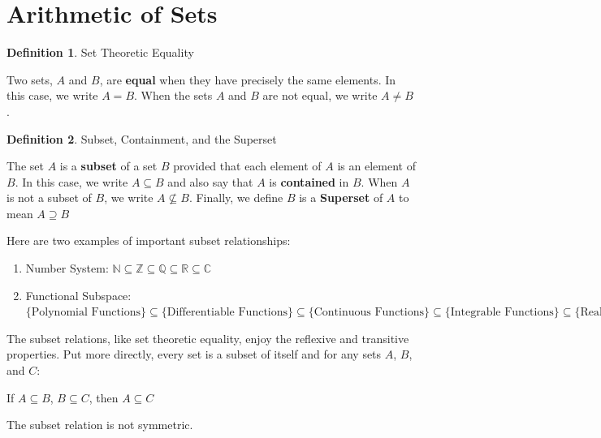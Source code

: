 \documentclass{book}
\theoremstyle{definition}
\newtheorem{definition}{Definition}[section]
\theoremstyle{remark}
\newcommand{\bb}[1]{\mathbb{#1}}
\begin{document}
\newpage
\section{Arithmetic of Sets}

\begin{definition}
Set Theoretic Equality \\
    \begin{tcolorbox}
        Two sets, $A$ and $B$, are {\bf equal} when they have precisely the same elements. In this case, we write $A = B$. When the sets $A$ and $B$ are not equal, we write $A \neq B$. 
    \end{tcolorbox}
\end{definition}
    

\begin{definition}
Subset, Containment, and the Superset \\
    
    \begin{tcolorbox}
        The set $A$ is a {\bf subset} of a set $B$ provided that each element of $A$ is an  element of $B$. In this case, we write $A \subseteq B$ and also say that $A$ is {\bf contained} in $B$. When $A$ is not a subset of $B$, we write $A \nsubseteq B$. Finally, we define $B$ is a \textbf{Superset} of $A$ to mean $A \supseteq B$ 
    \end{tcolorbox}
    
    Here are two examples of important subset relationships: 
        \begin{enumerate}
            \item Number System: $\bb{N} \subseteq \bb{Z} \subseteq \mathbb{Q} \subseteq \bb{R} \subseteq \bb{C}$ 
            
            \item Functional Subspace: $\{\text{Polynomial Functions}\} \subseteq \{\text{Differentiable Functions}\} \subseteq \{\text{Continuous Functions}\} \subseteq \{\text{Integrable Functions}\} \subseteq \{\text{Real-Valued Functions}\}$
        \end{enumerate}
    
    The subset relations, like set theoretic equality, enjoy the reflexive and transitive properties. Put more directly, every set is a subset of itself and for any sets $A$, $B$, and $C$:
        \begin{center}
            If $A \subseteq B$, $B \subseteq C$, then $A \subseteq C$
        \end{center}
    The subset relation is not symmetric. \\
    

\end{definition}
\end{document}
